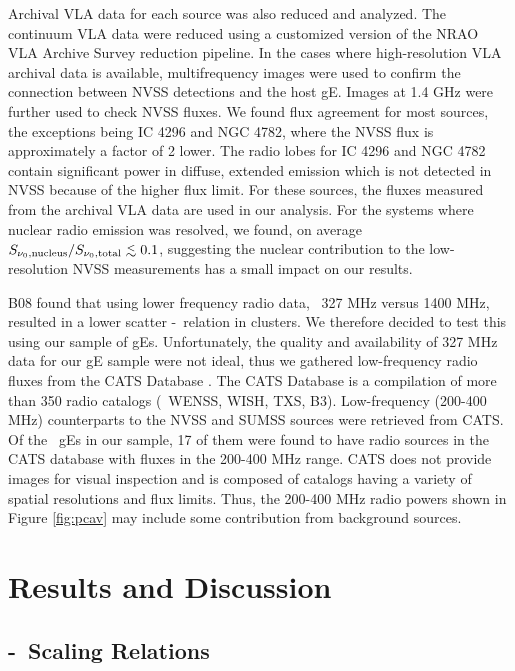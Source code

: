 \documentclass[12pt, preprint]{aastex}
\begin{document}
Archival VLA data for each source was also reduced and analyzed. The
continuum VLA data were reduced using a customized version of the NRAO
VLA Archive Survey reduction pipeline. In the cases where
high-resolution VLA archival data is available, multifrequency images
were used to confirm the connection between NVSS detections and the
host gE. Images at 1.4 GHz were further used to check NVSS fluxes. We
found flux agreement for most sources, the exceptions being IC 4296
and NGC 4782, where the NVSS flux is approximately a factor of 2
lower. The radio lobes for IC 4296 and NGC 4782 contain significant
power in diffuse, extended emission which is not detected in NVSS
because of the higher flux limit. For these sources, the fluxes
measured from the archival VLA data are used in our analysis. For the
systems where nuclear radio emission was resolved, we found, on
average $S_{\nu_0,\mathrm{nucleus}} / S_{\nu_0,\mathrm{total}} \la
0.1$, suggesting the nuclear contribution to the low-resolution NVSS
measurements has a small impact on our results.

B08 found that using lower frequency radio data, \ie\ 327 MHz versus
1400 MHz, resulted in a lower scatter \pjet-\prad\ relation in
clusters. We therefore decided to test this using our sample of
gEs. Unfortunately, the quality and availability of 327 MHz data for
our gE sample were not ideal, thus we gathered low-frequency radio
fluxes from the CATS Database \citep{cats}. The CATS Database is a
compilation of more than 350 radio catalogs (\eg\ WENSS, WISH, TXS,
B3). Low-frequency (200-400 MHz) counterparts to the NVSS and SUMSS
sources were retrieved from CATS. Of the \samp\ gEs in our sample, 17
of them were found to have radio sources in the CATS database with
fluxes in the 200-400 MHz range. CATS does not provide images for
visual inspection and is composed of catalogs having a variety of
spatial resolutions and flux limits. Thus, the 200-400 MHz radio
powers shown in Figure \ref{fig:pcav} may include some contribution
from background sources.

\section{Results and Discussion}
\label{sec:r&d}

\subsection{\pjet-\prad\ Scaling Relations}
\label{sec:relation}
\end{document}
